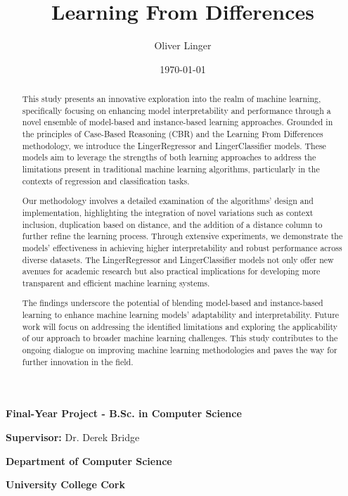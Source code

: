 \documentclass[a4paper, 12pt]{report}
\title{Learning From Differences}
\author{Oliver Linger}
\date{\today}
\begin{document}
\maketitle

\vspace*{\fill} %

\centering
\textbf{Final-Year Project - B.Sc. in Computer Science}

\textbf{Supervisor:} Dr. Derek Bridge

\textbf{Department of Computer Science}

\textbf{University College Cork}

\vspace*{\fill} %

\begin{abstract}
    This study presents an innovative exploration into the realm of machine learning, specifically focusing on enhancing model interpretability and 
    performance through a novel ensemble of model-based and instance-based learning approaches. Grounded in the principles of Case-Based Reasoning (CBR) 
    and the Learning From Differences methodology, we introduce the LingerRegressor and LingerClassifier models. These models aim to leverage the strengths 
    of both learning approaches to address the limitations present in traditional machine learning algorithms, particularly in the contexts of regression and classification tasks.

    Our methodology involves a detailed examination of the algorithms' design and implementation, highlighting the integration of novel variations such as context inclusion, 
    duplication based on distance, and the addition of a distance column to further refine the learning process. Through extensive experiments, we demonstrate the models' 
    effectiveness in achieving higher interpretability and robust performance across diverse datasets. The LingerRegressor and LingerClassifier models not 
    only offer new avenues for academic research but also practical implications for developing more transparent and efficient machine learning systems.
    
    The findings underscore the potential of blending model-based and instance-based learning to enhance machine learning models' adaptability and interpretability. 
    Future work will focus on addressing the identified limitations and exploring the applicability of our approach to broader machine learning challenges.
    This study contributes to the ongoing dialogue on improving machine learning methodologies and paves the way for further innovation in the field.
\end{abstract}
\end{document}
